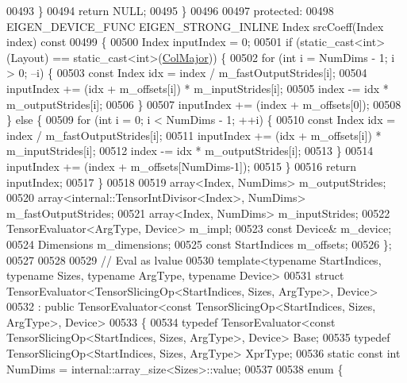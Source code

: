 \begin{DoxyCode}
00493     \}
00494     \textcolor{keywordflow}{return} NULL;
00495   \}
00496 
00497  \textcolor{keyword}{protected}:
00498   EIGEN\_DEVICE\_FUNC EIGEN\_STRONG\_INLINE Index srcCoeff(Index index)\textcolor{keyword}{ const}
00499 \textcolor{keyword}{  }\{
00500     Index inputIndex = 0;
00501     \textcolor{keywordflow}{if} (static\_cast<int>(Layout) == static\_cast<int>(\hyperlink{group__enums_ggaacded1a18ae58b0f554751f6cdf9eb13a0cbd4bdd0abcfc0224c5fcb5e4f6669a}{ColMajor})) \{
00502       \textcolor{keywordflow}{for} (\textcolor{keywordtype}{int} i = NumDims - 1; i > 0; --i) \{
00503         \textcolor{keyword}{const} Index idx = index / m\_fastOutputStrides[i];
00504         inputIndex += (idx + m\_offsets[i]) * m\_inputStrides[i];
00505         index -= idx * m\_outputStrides[i];
00506       \}
00507       inputIndex += (index + m\_offsets[0]);
00508     \} \textcolor{keywordflow}{else} \{
00509       \textcolor{keywordflow}{for} (\textcolor{keywordtype}{int} i = 0; i < NumDims - 1; ++i) \{
00510         \textcolor{keyword}{const} Index idx = index / m\_fastOutputStrides[i];
00511         inputIndex += (idx + m\_offsets[i]) * m\_inputStrides[i];
00512         index -= idx * m\_outputStrides[i];
00513       \}
00514       inputIndex += (index + m\_offsets[NumDims-1]);
00515     \}
00516     \textcolor{keywordflow}{return} inputIndex;
00517   \}
00518 
00519   array<Index, NumDims> m\_outputStrides;
00520   array<internal::TensorIntDivisor<Index>, NumDims> m\_fastOutputStrides;
00521   array<Index, NumDims> m\_inputStrides;
00522   TensorEvaluator<ArgType, Device> m\_impl;
00523   \textcolor{keyword}{const} Device& m\_device;
00524   Dimensions m\_dimensions;
00525   \textcolor{keyword}{const} StartIndices m\_offsets;
00526 \};
00527 
00528 
00529 \textcolor{comment}{// Eval as lvalue}
00530 \textcolor{keyword}{template}<\textcolor{keyword}{typename} StartIndices, \textcolor{keyword}{typename} Sizes, \textcolor{keyword}{typename} ArgType, \textcolor{keyword}{typename} Device>
00531 \textcolor{keyword}{struct }TensorEvaluator<TensorSlicingOp<StartIndices, Sizes, ArgType>, Device>
00532   : \textcolor{keyword}{public} TensorEvaluator<const TensorSlicingOp<StartIndices, Sizes, ArgType>, Device>
00533 \{
00534   \textcolor{keyword}{typedef} TensorEvaluator<const TensorSlicingOp<StartIndices, Sizes, ArgType>, Device> Base;
00535   \textcolor{keyword}{typedef} TensorSlicingOp<StartIndices, Sizes, ArgType> XprType;
00536   \textcolor{keyword}{static} \textcolor{keyword}{const} \textcolor{keywordtype}{int} NumDims = internal::array\_size<Sizes>::value;
00537 
00538   \textcolor{keyword}{enum} \{

\end{DoxyCode}
